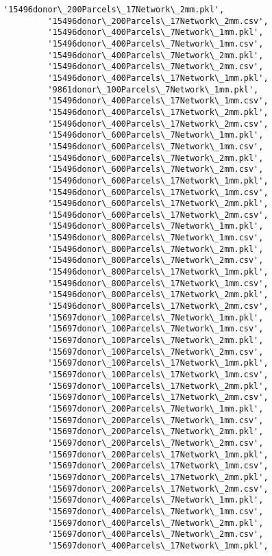 \documentclass[11pt]{article}
\begin{document}
\begin{Verbatim}[commandchars=\\\{\}]
         '15496donor\_200Parcels\_17Network\_2mm.pkl',
         '15496donor\_200Parcels\_17Network\_2mm.csv',
         '15496donor\_400Parcels\_7Network\_1mm.pkl',
         '15496donor\_400Parcels\_7Network\_1mm.csv',
         '15496donor\_400Parcels\_7Network\_2mm.pkl',
         '15496donor\_400Parcels\_7Network\_2mm.csv',
         '15496donor\_400Parcels\_17Network\_1mm.pkl',
         '9861donor\_100Parcels\_7Network\_1mm.pkl',
         '15496donor\_400Parcels\_17Network\_1mm.csv',
         '15496donor\_400Parcels\_17Network\_2mm.pkl',
         '15496donor\_400Parcels\_17Network\_2mm.csv',
         '15496donor\_600Parcels\_7Network\_1mm.pkl',
         '15496donor\_600Parcels\_7Network\_1mm.csv',
         '15496donor\_600Parcels\_7Network\_2mm.pkl',
         '15496donor\_600Parcels\_7Network\_2mm.csv',
         '15496donor\_600Parcels\_17Network\_1mm.pkl',
         '15496donor\_600Parcels\_17Network\_1mm.csv',
         '15496donor\_600Parcels\_17Network\_2mm.pkl',
         '15496donor\_600Parcels\_17Network\_2mm.csv',
         '15496donor\_800Parcels\_7Network\_1mm.pkl',
         '15496donor\_800Parcels\_7Network\_1mm.csv',
         '15496donor\_800Parcels\_7Network\_2mm.pkl',
         '15496donor\_800Parcels\_7Network\_2mm.csv',
         '15496donor\_800Parcels\_17Network\_1mm.pkl',
         '15496donor\_800Parcels\_17Network\_1mm.csv',
         '15496donor\_800Parcels\_17Network\_2mm.pkl',
         '15496donor\_800Parcels\_17Network\_2mm.csv',
         '15697donor\_100Parcels\_7Network\_1mm.pkl',
         '15697donor\_100Parcels\_7Network\_1mm.csv',
         '15697donor\_100Parcels\_7Network\_2mm.pkl',
         '15697donor\_100Parcels\_7Network\_2mm.csv',
         '15697donor\_100Parcels\_17Network\_1mm.pkl',
         '15697donor\_100Parcels\_17Network\_1mm.csv',
         '15697donor\_100Parcels\_17Network\_2mm.pkl',
         '15697donor\_100Parcels\_17Network\_2mm.csv',
         '15697donor\_200Parcels\_7Network\_1mm.pkl',
         '15697donor\_200Parcels\_7Network\_1mm.csv',
         '15697donor\_200Parcels\_7Network\_2mm.pkl',
         '15697donor\_200Parcels\_7Network\_2mm.csv',
         '15697donor\_200Parcels\_17Network\_1mm.pkl',
         '15697donor\_200Parcels\_17Network\_1mm.csv',
         '15697donor\_200Parcels\_17Network\_2mm.pkl',
         '15697donor\_200Parcels\_17Network\_2mm.csv',
         '15697donor\_400Parcels\_7Network\_1mm.pkl',
         '15697donor\_400Parcels\_7Network\_1mm.csv',
         '15697donor\_400Parcels\_7Network\_2mm.pkl',
         '15697donor\_400Parcels\_7Network\_2mm.csv',
         '15697donor\_400Parcels\_17Network\_1mm.pkl',

\end{Verbatim}
\end{document}
